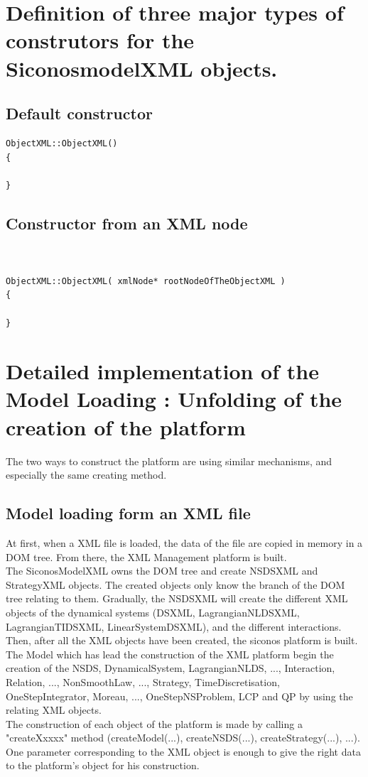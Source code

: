 \clearpage
\section{Definition of three major types of construtors for the SiconosmodelXML objects.}


\subsection{Default constructor}

\begin{verbatim}
ObjectXML::ObjectXML() 
{

}
\end{verbatim}



\subsection{Constructor from an XML node}


\begin{verbatim}


ObjectXML::ObjectXML( xmlNode* rootNodeOfTheObjectXML ) 
{

}
\end{verbatim}
\clearpage
\section{Detailed implementation of the Model Loading : Unfolding of the creation of the platform}
The two ways to construct the platform are using similar mechanisms, and especially the same creating
method.



\subsection{Model loading form an XML file}


At first, when a XML file is loaded, the data of the file are copied in memory in a DOM tree. From
there, the XML Management platform is built.\\
The SiconosModelXML owns the DOM tree and create NSDSXML and StrategyXML objects. The created objects
only know the branch of the DOM tree relating to them. Gradually, the NSDSXML will create the
different XML objects of the dynamical systems (DSXML, LagrangianNLDSXML, LagrangianTIDSXML,
LinearSystemDSXML), and the different interactions.\\
Then, after all the XML objects have been created, the \ac{siconos} platform is built.\\
The Model which has lead the construction of the XML platform begin the creation of the NSDS,
DynamicalSystem, LagrangianNLDS, ..., Interaction, Relation, ..., NonSmoothLaw, ..., Strategy,
TimeDiscretisation, OneStepIntegrator, Moreau, ..., OneStepNSProblem, LCP and QP by using the
relating XML objects.\\
The construction of each object of the platform is made by calling a
"createXxxxx" method (createModel(...), createNSDS(...), createStrategy(...), ...). One parameter
corresponding to the XML object is enough to give the right data to the platform's object for his
construction.


